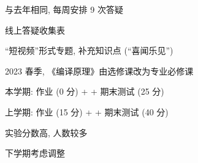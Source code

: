 \begin{frame}{}
  \begin{center}
    与去年相同, 每周安排 9 次答疑
  \end{center}
\end{frame}

\begin{frame}{}
  \begin{center}
     线上答疑收集表
  \end{center}
\end{frame}

\begin{frame}{}
\end{frame}

\begin{frame}{}
  \begin{center}
    ``短视频''形式专题, 补充知识点 (``喜闻乐见'')
  \end{center}
\end{frame}

\begin{frame}{}
  \begin{center}
    2023 春季, 《编译原理》由选修课改为专业必修课

    \vspace{0.30cm}
  \end{center}
\end{frame}

\begin{frame}{}
  \begin{center}
    本学期: {作业 (0 分) +  + 期末测试 (25 分)}

    \vspace{0.80cm}

    上学期: {作业 (15 分) +  + 期末测试 (40 分)}

    \vspace{1.50cm}
    实验分数高, 人数较多

    \vspace{0.60cm}
    下学期考虑调整
  \end{center}
\end{frame}

